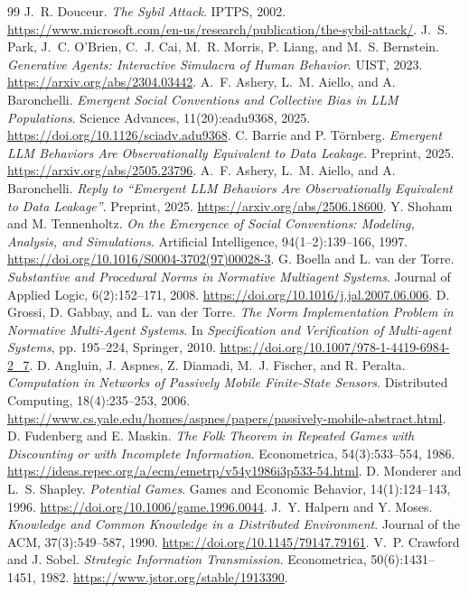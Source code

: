 \documentclass[11pt,letterpaper]{article}
\theoremstyle{plain}
\theoremstyle{definition}
\theoremstyle{remark}
\begin{document}
\begin{thebibliography}{99}
 J.~R. Douceur. \emph{The Sybil Attack}. IPTPS, 2002. \url{https://www.microsoft.com/en-us/research/publication/the-sybil-attack/}.
 J.~S. Park, J.~C. O'Brien, C.~J. Cai, M.~R. Morris, P. Liang, and M.~S. Bernstein. \emph{Generative Agents: Interactive Simulacra of Human Behavior}. UIST, 2023. \url{https://arxiv.org/abs/2304.03442}.
 A.~F. Ashery, L.~M. Aiello, and A. Baronchelli. \emph{Emergent Social Conventions and Collective Bias in LLM Populations}. Science Advances, 11(20):eadu9368, 2025. \url{https://doi.org/10.1126/sciadv.adu9368}.
 C. Barrie and P. T\"ornberg. \emph{Emergent LLM Behaviors Are Observationally Equivalent to Data Leakage}. Preprint, 2025. \url{https://arxiv.org/abs/2505.23796}.
 A.~F. Ashery, L.~M. Aiello, and A. Baronchelli. \emph{Reply to ``Emergent LLM Behaviors Are Observationally Equivalent to Data Leakage''}. Preprint, 2025. \url{https://arxiv.org/abs/2506.18600}.
 Y. Shoham and M. Tennenholtz. \emph{On the Emergence of Social Conventions: Modeling, Analysis, and Simulations}. Artificial Intelligence, 94(1--2):139--166, 1997. \url{https://doi.org/10.1016/S0004-3702(97)00028-3}.
 G. Boella and L. van der Torre. \emph{Substantive and Procedural Norms in Normative Multiagent Systems}. Journal of Applied Logic, 6(2):152--171, 2008. \url{https://doi.org/10.1016/j.jal.2007.06.006}.
 D. Grossi, D. Gabbay, and L. van der Torre. \emph{The Norm Implementation Problem in Normative Multi-Agent Systems}. In \emph{Specification and Verification of Multi-agent Systems}, pp. 195--224, Springer, 2010. \url{https://doi.org/10.1007/978-1-4419-6984-2_7}.
 D. Angluin, J. Aspnes, Z. Diamadi, M.~J. Fischer, and R. Peralta. \emph{Computation in Networks of Passively Mobile Finite-State Sensors}. Distributed Computing, 18(4):235--253, 2006. \url{https://www.cs.yale.edu/homes/aspnes/papers/passively-mobile-abstract.html}.
 D. Fudenberg and E. Maskin. \emph{The Folk Theorem in Repeated Games with Discounting or with Incomplete Information}. Econometrica, 54(3):533--554, 1986. \url{https://ideas.repec.org/a/ecm/emetrp/v54y1986i3p533-54.html}.
 D. Monderer and L.~S. Shapley. \emph{Potential Games}. Games and Economic Behavior, 14(1):124--143, 1996. \url{https://doi.org/10.1006/game.1996.0044}.
 J.~Y. Halpern and Y. Moses. \emph{Knowledge and Common Knowledge in a Distributed Environment}. Journal of the ACM, 37(3):549--587, 1990. \url{https://doi.org/10.1145/79147.79161}.
 V.~P. Crawford and J. Sobel. \emph{Strategic Information Transmission}. Econometrica, 50(6):1431--1451, 1982. \url{https://www.jstor.org/stable/1913390}.


\end{thebibliography}
\end{document}
